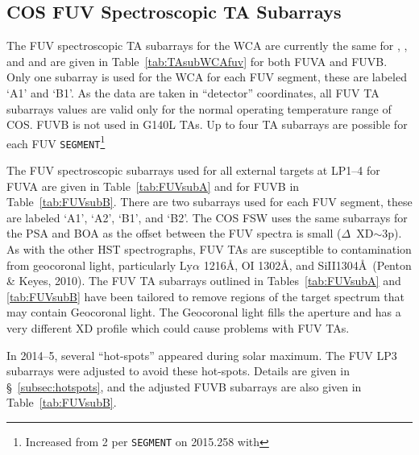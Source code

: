 \subsection{COS FUV Spectroscopic TA Subarrays}\label{subsec:FUVsupSUBS}
The FUV spectroscopic TA subarrays for the WCA are currently the same for ,  , and 
and are given in Table~\ref{tab:TAsubWCAfuv} for both FUVA and FUVB.
Only one subarray is used for the WCA for each FUV segment, these are labeled `A1' and `B1'.
As the data are taken in ``detector'' coordinates, all FUV TA subarrays values are valid only for the normal operating temperature range of COS.
FUVB is not used in G140L TAs. Up to four TA subarrays are possible for each FUV \texttt{SEGMENT}\footnote{Increased from 2 per \texttt{SEGMENT} on 2015.258 with }

The FUV spectroscopic subarrays used for all external targets at LP1--4 for FUVA are given in Table~\ref{tab:FUVsubA} and for FUVB in Table~\ref{tab:FUVsubB}.
There are two subarrays used for each FUV segment, these are labeled `A1', `A2', `B1', and `B2'.
The COS FSW uses the same subarrays for the PSA and BOA as the offset between the FUV spectra is small ($\Delta$~XD$\sim$3p).
As with the other HST spectrographs, FUV TAs are susceptible to contamination from geocoronal light, particularly Ly$\alpha$ 1216\AA, {\rm O}\textsc{I} 1302\AA, and {\rm Si}{\sc II}1304\AA\ (Penton \& Keyes, 2010).
The FUV TA subarrays outlined in Tables~\ref{tab:FUVsubA} and \ref{tab:FUVsubB} have been tailored to remove regions
of the target spectrum that may contain Geocoronal light. The Geocoronal light fills the aperture and has a very different XD profile which could cause problems with FUV TAs.

In 2014--5, several ``hot-spots'' appeared during solar maximum. The FUV LP3 subarrays were adjusted to avoid these hot-spots.
Details are given in \S~\ref{subsec:hotspots}, and the adjusted FUVB subarrays are also given in Table~\ref{tab:FUVsubB}.

